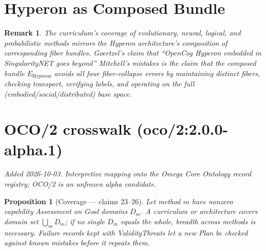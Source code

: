 \documentclass[11pt]{article}
\newtheorem{proposition}{Proposition}
\newtheorem{remark}{Remark}
\begin{document}
\section{Hyperon as Composed Bundle}

\begin{remark}
The curriculum's coverage of evolutionary, neural, logical, and
probabilistic methods mirrors the Hyperon architecture's composition of
corresponding fiber bundles. Goertzel's claim that ``OpenCog Hyperon
embedded in SingularityNET goes beyond'' Mitchell's mistakes is the
claim that the composed bundle $E_{\text{Hyperon}}$ avoids all four
fiber-collapse errors by maintaining distinct fibers, checking
transport, verifying labels, and operating on the full
(embodied/social/distributed) base space.
\end{remark}



\section{OCO/2 crosswalk (oco/2:2.0.0-alpha.1)}
\emph{Added 2026-10-03. Interpretive mapping onto the Omega Core Ontology
record registry; OCO/2 is an unfrozen alpha candidate.}

\begin{proposition}[Coverage --- claims 23--26]
Let method $m$ have nonzero capability Assessment on Goal domains $D_m$. A curriculum or architecture covers domain set $\bigcup_m D_m$; if no single $D_m$ equals the whole, breadth across methods is necessary. Failure records kept with ValidityThreats let a new Plan be checked against known mistakes before it repeats them.
\end{proposition}
\end{document}
